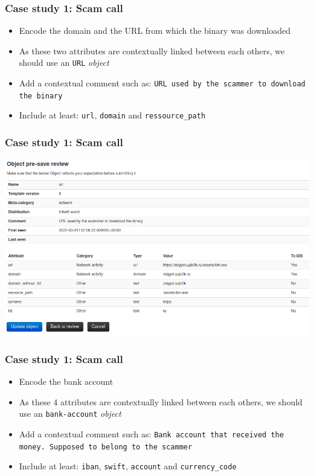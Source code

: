 \begin{frame}
    \frametitle{Case study 1: Scam call}
    \begin{itemize}
        \item Encode the domain and the URL from which the binary was downloaded
        \item As these two attributes are contextually linked between each others, we should use an \texttt{URL} \textit{object}
        \item Add a contextual comment such as: \texttt{URL used by the scammer to download the binary}
        \item Include at least: \texttt{url}, \texttt{domain} and \texttt{ressource\_path}
    \end{itemize}
\end{frame}

\begin{frame}
    \frametitle{Case study 1: Scam call}
    \begin{center}
        \includegraphics[width=1.0\linewidth]{pictures/case1/object-url.png}
    \end{center}
\end{frame}

\begin{frame}
    \frametitle{Case study 1: Scam call}
    \begin{itemize}
        \item Encode the bank account
        \item As these 4 attributes are contextually linked between each others, we should use an \texttt{bank-account} \textit{object}
        \item Add a contextual comment such as: \texttt{Bank account that received the money. Supposed to belong to the scammer}
        \item Include at least: \texttt{iban}, \texttt{swift}, \texttt{account} and \texttt{currency\_code}
    \end{itemize}
\end{frame}


